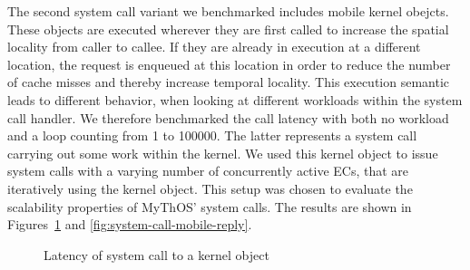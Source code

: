 The second system call variant we benchmarked includes mobile kernel obejcts.
These objects are executed wherever they are first called to increase the
spatial locality from caller to callee. If they are already in execution at a
different location, the request is enqueued at this location in order to reduce
the number of cache misses and thereby increase temporal locality. This
execution semantic leads to different behavior, when looking at different
workloads within the system call handler. We therefore benchmarked the call
latency with both no workload and a loop counting from \num{1} to \num{100000}.
The latter represents a system call carrying out some work within the kernel. We
used this kernel object to issue system calls with a varying number of
concurrently active ECs, that are iteratively using the kernel object. This
setup was chosen to evaluate the scalability properties of MyThOS' system calls.
The results are shown in Figures~\ref{fig:system-call-mobile-return} and \ref{fig:system-call-mobile-reply}.

\begin{figure}[ht!]
  \begin{center}
    \caption{Latency of system call to a kernel object}
    \label{fig:system-call-mobile-return}
  \end{center}
\end{figure}

